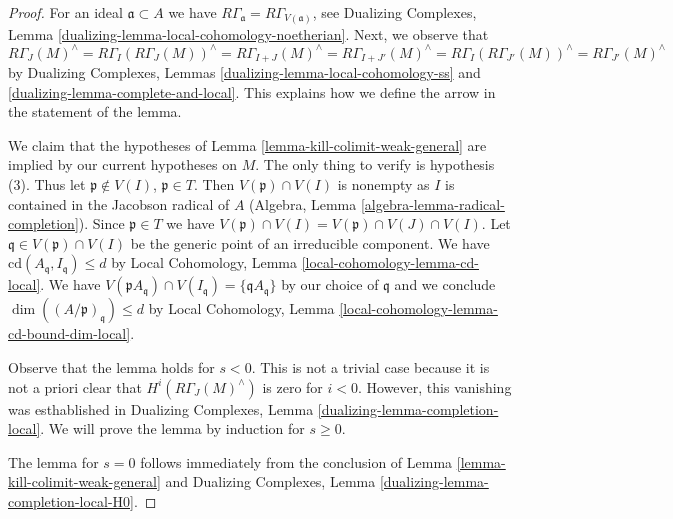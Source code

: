 \begin{proof}
For an ideal $\mathfrak a \subset A$ we have
$R\Gamma_\mathfrak a = R\Gamma_{V(\mathfrak a)}$, see
Dualizing Complexes, Lemma \ref{dualizing-lemma-local-cohomology-noetherian}.
Next, we observe that
$$
R\Gamma_J(M)^\wedge =
R\Gamma_I(R\Gamma_J(M))^\wedge =
R\Gamma_{I + J}(M)^\wedge =
R\Gamma_{I + J'}(M)^\wedge =
R\Gamma_I(R\Gamma_{J'}(M))^\wedge =
R\Gamma_{J'}(M)^\wedge
$$
by Dualizing Complexes, Lemmas \ref{dualizing-lemma-local-cohomology-ss} and
\ref{dualizing-lemma-complete-and-local}.
This explains how we define the arrow in the statement of the lemma.

\medskip\noindent
We claim that the hypotheses of Lemma \ref{lemma-kill-colimit-weak-general}
are implied by our current hypotheses on $M$.
The only thing to verify is hypothesis (3).
Thus let $\mathfrak p \not \in V(I)$, $\mathfrak p \in T$.
Then $V(\mathfrak p) \cap V(I)$ is nonempty as $I$ is
contained in the Jacobson radical of $A$
(Algebra, Lemma \ref{algebra-lemma-radical-completion}).
Since $\mathfrak p \in T$ we have
$V(\mathfrak p) \cap V(I) = V(\mathfrak p) \cap V(J) \cap V(I)$.
Let $\mathfrak q \in V(\mathfrak p) \cap V(I)$ be the
generic point of an irreducible component.
We have $\text{cd}(A_\mathfrak q, I_\mathfrak q) \leq d$
by Local Cohomology, Lemma \ref{local-cohomology-lemma-cd-local}.
We have $V(\mathfrak pA_\mathfrak q) \cap V(I_\mathfrak q) =
\{\mathfrak qA_\mathfrak q\}$ by our choice of $\mathfrak q$
and we conclude $\dim((A/\mathfrak p)_\mathfrak q) \leq d$
by Local Cohomology, Lemma \ref{local-cohomology-lemma-cd-bound-dim-local}.

\medskip\noindent
Observe that the lemma holds for $s < 0$. This is not a trivial case because
it is not a priori clear that $H^i(R\Gamma_J(M)^\wedge)$
is zero for $i < 0$. However, this vanishing was esthablished in
Dualizing Complexes, Lemma \ref{dualizing-lemma-completion-local}.
We will prove the lemma by induction for $s \geq 0$.

\medskip\noindent
The lemma for $s = 0$ follows immediately from
the conclusion of Lemma \ref{lemma-kill-colimit-weak-general}
and Dualizing Complexes, Lemma \ref{dualizing-lemma-completion-local-H0}.


\end{proof}
